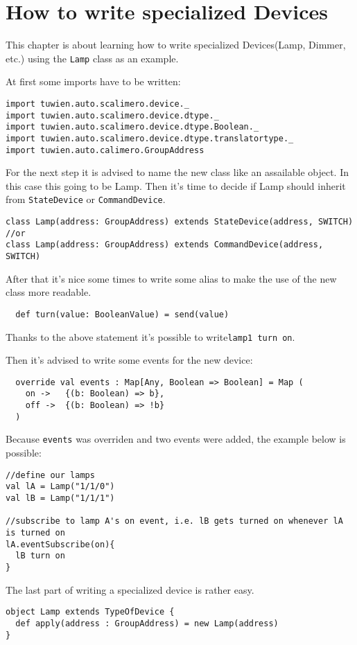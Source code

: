 \chapter{How to write specialized Devices}
This chapter is about learning how to write specialized Devices(Lamp, Dimmer, etc.) using the \lstinline!Lamp! class as an example.

At first some imports have to be written:
\begin{lstlisting}
import tuwien.auto.scalimero.device._
import tuwien.auto.scalimero.device.dtype._
import tuwien.auto.scalimero.device.dtype.Boolean._
import tuwien.auto.scalimero.device.dtype.translatortype._
import tuwien.auto.calimero.GroupAddress
\end{lstlisting}
For the next step it is advised to name the new class like an assailable object. In this case this going to be Lamp. Then it's time to decide if Lamp should inherit from \lstinline!StateDevice! or \lstinline!CommandDevice!.
\begin{lstlisting}
class Lamp(address: GroupAddress) extends StateDevice(address, SWITCH)
//or
class Lamp(address: GroupAddress) extends CommandDevice(address, SWITCH)
\end{lstlisting}
After that it's nice some times to write some alias to make the use of the new class more readable.
\begin{lstlisting}
  def turn(value: BooleanValue) = send(value)
\end{lstlisting}
 Thanks to the above statement it's possible to write\lstinline!lamp1 turn on!.
 
 Then it's advised to write some events for the new device:
\begin{lstlisting}
  override val events : Map[Any, Boolean => Boolean] = Map (
    on ->   {(b: Boolean) => b},
    off ->  {(b: Boolean) => !b}
  )
\end{lstlisting}
Because \lstinline!events! was overriden and two events were added, the example below is possible:
\begin{lstlisting}
//define our lamps
val lA = Lamp("1/1/0")
val lB = Lamp("1/1/1")

//subscribe to lamp A's on event, i.e. lB gets turned on whenever lA is turned on
lA.eventSubscribe(on){
  lB turn on
}
\end{lstlisting}

The last part of writing a specialized device is rather easy. \begin{lstlisting}
object Lamp extends TypeOfDevice {
  def apply(address : GroupAddress) = new Lamp(address)
}
\end{lstlisting}